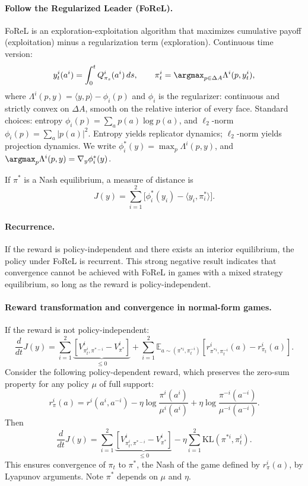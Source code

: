 \paragraph{Follow the Regularized Leader (FoReL).}
FoReL is an exploration-exploitation algorithm that maximizes cumulative payoff (exploitation) minus a regularization term (exploration). Continuous time version:
$$y_t^i(a^i) = \int_0^t Q^i_{\pi_s}(a^i)\, ds,\qquad \pi^i_t=\argmax_{p \in \Delta A} \Lambda^i(p, y_t^i),$$
where $\Lambda^i(p, y) = \langle y, p \rangle - \phi_i(p)$ and $\phi_i$ is the regularizer: continuous and strictly convex on $\Delta A$, smooth on the relative interior of every face. Standard choices: entropy $\phi_i(p)=\sum_a p(a) \log p(a)$, and $\ell_2$-norm $\phi_i(p)=\sum_a |p(a)|^2$. Entropy yields replicator dynamics; $\ell_2$-norm yields projection dynamics. We write $\phi_i^*(y) = \max_p \Lambda^i(p, y)$, and $\argmax_p \Lambda^i(p, y) = \nabla_y \phi_i^*(y)$.

If $\pi^*$ is a Nash equilibrium, a measure of distance is
$$J(y) = \sum_{i=1}^2 \big[ \phi_i^*(y_i) - \langle y_i, \pi^*_i \rangle\big].$$

\paragraph{Recurrence.}
If the reward is policy-independent and there exists an interior equilibrium, the policy under FoReL is recurrent. This strong negative result indicates that convergence cannot be achieved with FoReL in games with a mixed strategy equilibrium, so long as the reward is policy-independent.

\paragraph{Reward transformation and convergence in normal-form games.}
If the reward is not policy-independent:
$$\frac{d}{dt}J(y) = \sum_{i=1}^2 \underbrace{[V^i_{\pi^i_t, \pi^{*-i}} - V^i_{\pi^*}]}_{\leq 0} + \sum_{i=1}^2 \mathbb{E}_{a \sim (\pi^{*i}, \pi_t^{-i})}\!\left[r^i_{\pi^{*i}, \pi_t^{-i}}(a) - r^i_{\pi_t}(a)\right].$$
Consider the following policy-dependent reward, which preserves the zero-sum property for any policy $\mu$ of full support:
$$r^i_\pi(a) = r^i(a^i, a^{-i}) - \eta \log \frac{\pi^i(a^i)}{\mu^i(a^i)} + \eta \log \frac{\pi^{-i}(a^{-i})}{\mu^{-i}(a^{-i})}.$$
Then
$$\frac{d}{dt}J(y) = \sum_{i=1}^2 \underbrace{[V^i_{\pi^i_t, \pi^{*-i}} - V^i_{\pi^*}]}_{\leq 0} - \eta \sum_{i=1}^2 \textrm{KL}(\pi^{*i}, \pi^{i}_t).$$
This ensures convergence of $\pi_t$ to $\pi^*$, the Nash of the game defined by $r^i_\pi(a)$, by Lyapunov arguments. Note $\pi^*$ depends on $\mu$ and $\eta$.

